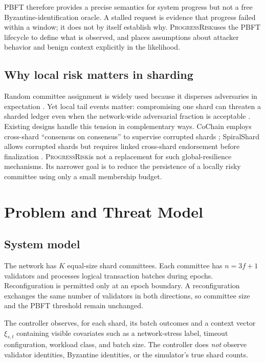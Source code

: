 \documentclass[10pt,conference]{IEEEtran}
\newcommand{\sysname}{\textsc{ProgressRisk}}
\begin{document}
PBFT therefore provides a precise semantics for system progress but not a free Byzantine-identification oracle. A stalled request is evidence that progress failed within a window; it does not by itself establish why. \sysname uses the PBFT lifecycle to define what is observed, and places assumptions about attacker behavior and benign context explicitly in the likelihood.

\subsection{Why local risk matters in sharding}

Random committee assignment is widely used because it disperses adversaries in expectation \cite{omniledger,rapidchain}. Yet local tail events matter: compromising one shard can threaten a sharded ledger even when the network-wide adversarial fraction is acceptable \cite{han2022allocation}. Existing designs handle this tension in complementary ways. CoChain employs cross-shard ``consensus on consensus'' to supervise corrupted shards \cite{cochain}; SpiralShard allows corrupted shards but requires linked cross-shard endorsement before finalization \cite{spiralshard}. \sysname is not a replacement for such global-resilience mechanisms. Its narrower goal is to reduce the persistence of a locally risky committee using only a small membership budget.

\section{Problem and Threat Model}

\subsection{System model}

The network has $K$ equal-size shard committees. Each committee has $n=3f+1$ validators and processes logical transaction batches during epochs. Reconfiguration is permitted only at an epoch boundary. A reconfiguration exchanges the same number of validators in both directions, so committee size and the PBFT threshold remain unchanged.

The controller observes, for each shard, its batch outcomes and a context vector $\xi_{s,t}$ containing visible covariates such as a network-stress label, timeout configuration, workload class, and batch size. The controller does \emph{not} observe validator identities, Byzantine identities, or the simulator's true shard counts.
\end{document}
